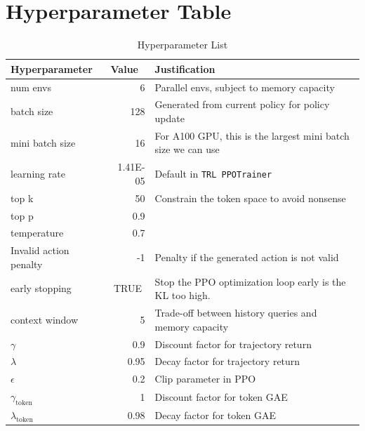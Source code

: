 \documentclass[11pt,a4paper]{article}
\begin{document}
\newpage
\section{Hyperparameter Table}
\label{appendix:hyperparameter}
\begin{table}[htbp]
\begin{tabular}{|l|r|l|}
\hline
\textbf{Hyperparameter} & \multicolumn{1}{l|}{\textbf{Value}} & \textbf{Justification}                                       \\ \hline
num envs               & 6                                   & Parallel envs, subject to memory capacity                           \\
batch size             & 128                                 & Generated from current policy for policy update               \\
mini batch size       & 16                                  & For A100 GPU, this is the largest mini batch size we can use \\
learning rate          & 1.41E-05                            & Default in \texttt{TRL PPOTrainer}                                    \\
top k                  & 50                                  & Constrain the token space to avoid nonsense                  \\
top p                  & 0.9                                 &                                                              \\
temperature             & 0.7                                 &                                                              \\
Invalid action penalty  & -1                                  & Penalty if the generated action is not valid                 \\
early stopping         & \multicolumn{1}{c|}{TRUE}           & Stop the PPO optimization loop early is the KL too high.     \\
context window         & 5                                   & Trade-off between history queries and memory capacity        \\
$\gamma$                & 0.9                                 & Discount factor for trajectory return                        \\
$\lambda$               & 0.95                                & Decay factor for trajectory return                                                          \\
$\epsilon$              & 0.2                                 & Clip parameter in PPO                                                          \\
$\gamma_{\text{token}}$ & 1                                   & Discount factor for token GAE                                                             \\
$\lambda_{\text{token}}$& 0.98                                & Decay factor for token GAE                                                            \\ \hline
\end{tabular}
\caption{Hyperparameter List}
\end{table}
\end{document}

